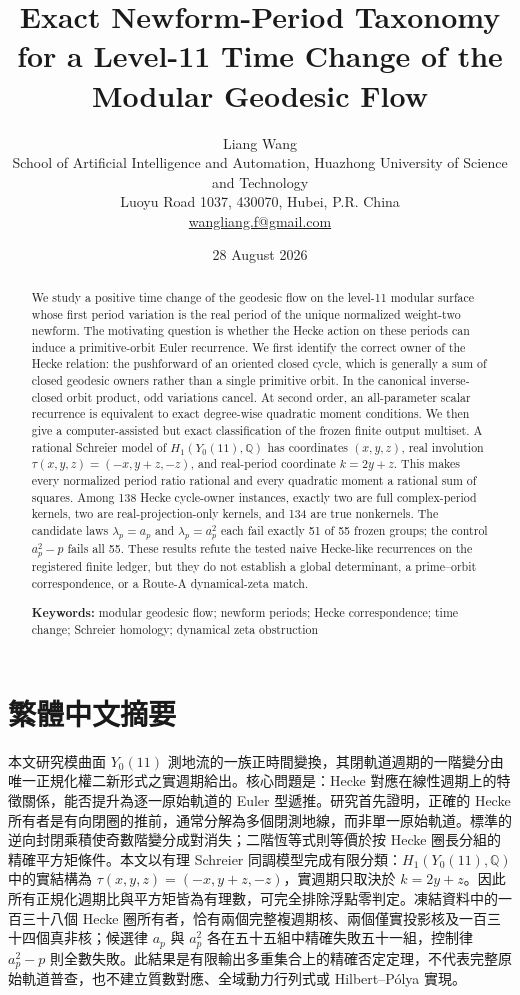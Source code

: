\documentclass[11pt]{article}
\title{Exact Newform-Period Taxonomy for a Level-11 Time Change of the Modular Geodesic Flow}
\author{Liang Wang\\[2pt]
\small School of Artificial Intelligence and Automation, Huazhong University of Science and Technology\\
\small Luoyu Road 1037, 430070, Hubei, P.R. China\\
\small \href{mailto:wangliang.f@gmail.com}{wangliang.f@gmail.com}}
\date{28 August 2026}
\theoremstyle{definition}
\theoremstyle{remark}
\newcommand{\QQ}{\mathbb Q}
\begin{document}
\maketitle

\begin{abstract}
We study a positive time change of the geodesic flow on the level-11 modular surface whose first period variation is the real period of the unique normalized weight-two newform. The motivating question is whether the Hecke action on these periods can induce a primitive-orbit Euler recurrence. We first identify the correct owner of the Hecke relation: the pushforward of an oriented closed cycle, which is generally a sum of closed geodesic owners rather than a single primitive orbit. In the canonical inverse-closed orbit product, odd variations cancel. At second order, an all-parameter scalar recurrence is equivalent to exact degree-wise quadratic moment conditions. We then give a computer-assisted but exact classification of the frozen finite output multiset. A rational Schreier model of $H_1(Y_0(11),\QQ)$ has coordinates $(x,y,z)$, real involution $\tau(x,y,z)=(-x,y+z,-z)$, and real-period coordinate $k=2y+z$. This makes every normalized period ratio rational and every quadratic moment a rational sum of squares. Among 138 Hecke cycle-owner instances, exactly two are full complex-period kernels, two are real-projection-only kernels, and 134 are true nonkernels. The candidate laws $\lambda_p=a_p$ and $\lambda_p=a_p^2$ each fail exactly 51 of 55 frozen groups; the control $a_p^2-p$ fails all 55. These results refute the tested naive Hecke-like recurrences on the registered finite ledger, but they do not establish a global determinant, a prime--orbit correspondence, or a Route-A dynamical-zeta match.

\medskip
\noindent\textbf{Keywords:} modular geodesic flow; newform periods; Hecke correspondence; time change; Schreier homology; dynamical zeta obstruction
\end{abstract}

\section*{繁體中文摘要}
本文研究模曲面 $Y_0(11)$ 測地流的一族正時間變換，其閉軌道週期的一階變分由唯一正規化權二新形式之實週期給出。核心問題是：Hecke 對應在線性週期上的特徵關係，能否提升為逐一原始軌道的 Euler 型遞推。研究首先證明，正確的 Hecke 所有者是有向閉圈的推前，通常分解為多個閉測地線，而非單一原始軌道。標準的逆向封閉乘積使奇數階變分成對消失；二階恆等式則等價於按 Hecke 圈長分組的精確平方矩條件。本文以有理 Schreier 同調模型完成有限分類：$H_1(Y_0(11),\QQ)$ 中的實結構為 $\tau(x,y,z)=(-x,y+z,-z)$，實週期只取決於 $k=2y+z$。因此所有正規化週期比與平方矩皆為有理數，可完全排除浮點零判定。凍結資料中的一百三十八個 Hecke 圈所有者，恰有兩個完整複週期核、兩個僅實投影核及一百三十四個真非核；候選律 $a_p$ 與 $a_p^2$ 各在五十五組中精確失敗五十一組，控制律 $a_p^2-p$ 則全數失敗。此結果是有限輸出多重集合上的精確否定定理，不代表完整原始軌道普查，也不建立質數對應、全域動力行列式或 Hilbert--Pólya 實現。
\end{document}
